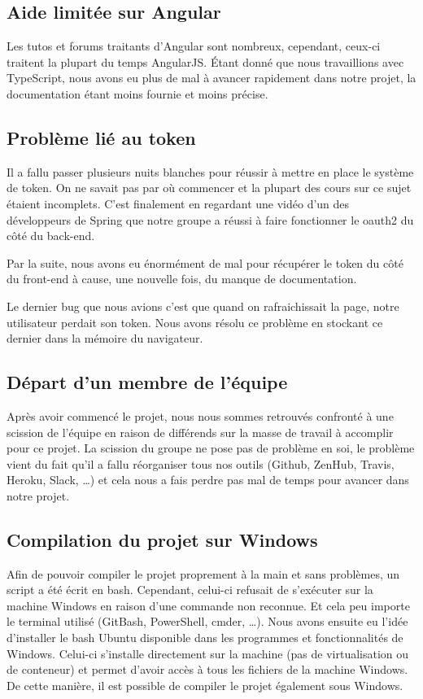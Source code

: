 	\subsection{Aide limitée sur Angular}
	Les tutos et forums traitants d'Angular sont nombreux, cependant, ceux-ci traitent la plupart du temps AngularJS. Étant donné que nous travaillions avec TypeScript, nous avons eu plus de mal à avancer rapidement dans notre projet, la documentation étant moins fournie et moins précise.
	
	\subsection{Problème lié au token}
	Il a fallu passer plusieurs nuits blanches pour réussir à mettre en place le système de token. On ne savait pas par où commencer et la plupart des cours sur ce sujet étaient incomplets. C'est finalement en regardant une vidéo d'un des développeurs de Spring que notre groupe a réussi à faire fonctionner le oauth2 du côté du back-end.
	
	Par la suite, nous avons eu énormément de mal pour récupérer le token du côté du front-end à cause, une nouvelle fois, du manque de documentation.
	
	Le dernier bug que nous avions c'est que quand on rafraichissait la page, notre utilisateur perdait son token. Nous avons résolu ce problème en stockant ce dernier dans la mémoire du navigateur.
	
	\subsection{Départ d'un membre de l'équipe}
	Après avoir commencé le projet, nous nous sommes retrouvés confronté à une scission de l'équipe en raison de différends sur la masse de travail à accomplir pour ce projet. La scission du groupe ne pose pas de problème en soi, le problème vient du fait qu'il a fallu réorganiser tous nos outils (Github, ZenHub, Travis, Heroku, Slack, \dots) et cela nous a fais perdre pas mal de temps pour avancer dans notre projet.
	
	\subsection{Compilation du projet sur Windows}
	Afin de pouvoir compiler le projet proprement à la main et sans problèmes, un script a été écrit en bash. Cependant, celui-ci refusait de s'exécuter sur la machine Windows en raison d'une commande non reconnue. Et cela peu importe le terminal utilisé (GitBash, PowerShell, cmder, \dots). Nous avons ensuite eu l'idée d'installer le bash Ubuntu disponible dans les programmes et fonctionnalités de Windows. Celui-ci s'installe directement sur la machine (pas de virtualisation ou de conteneur) et permet d'avoir accès à tous les fichiers de la machine Windows.
	De cette manière, il est possible de compiler le projet également sous Windows.